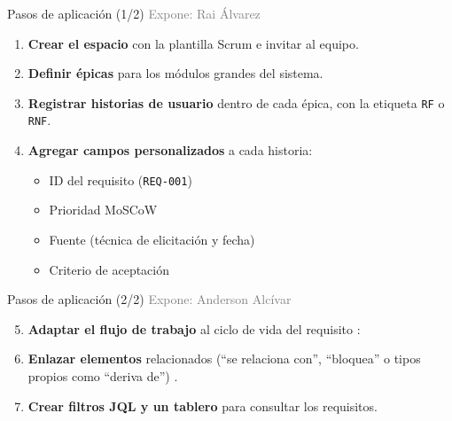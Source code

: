 \documentclass[aspectratio=169,11pt]{beamer}
\newcommand{\expone}[1]{\hfill{\scriptsize\textcolor{gray}{Expone: #1}}}
\begin{document}
\begin{frame}{Pasos de aplicación (1/2)}
  \expone{Rai Álvarez}
  \begin{enumerate}
    \item \textbf{Crear el espacio} con la plantilla Scrum e invitar al equipo.
    \item \textbf{Definir épicas} para los módulos grandes del sistema.
    \item \textbf{Registrar historias de usuario} dentro de cada épica, con
          la etiqueta \texttt{RF} o \texttt{RNF}.
    \item \textbf{Agregar campos personalizados} a cada historia:
      \begin{itemize}
        \item ID del requisito (\texttt{REQ-001})
        \item Prioridad MoSCoW
        \item Fuente (técnica de elicitación y fecha)
        \item Criterio de aceptación
      \end{itemize}
  \end{enumerate}
\end{frame}

\begin{frame}{Pasos de aplicación (2/2)}
  \expone{Anderson Alcívar}
  \begin{enumerate}
    \setcounter{enumi}{4}
    \item \textbf{Adaptar el flujo de trabajo} al ciclo de vida del requisito
          \cite{atlassianworkflow}:
  \end{enumerate}
  \begin{center}
  \end{center}
  \begin{enumerate}
    \setcounter{enumi}{5}
    \item \textbf{Enlazar elementos} relacionados (``se relaciona con'',
          ``bloquea'' o tipos propios como ``deriva de'')
          \cite{atlassianlinking}.
    \item \textbf{Crear filtros JQL y un tablero} para consultar los requisitos.
  \end{enumerate}
\end{frame}
\end{document}
